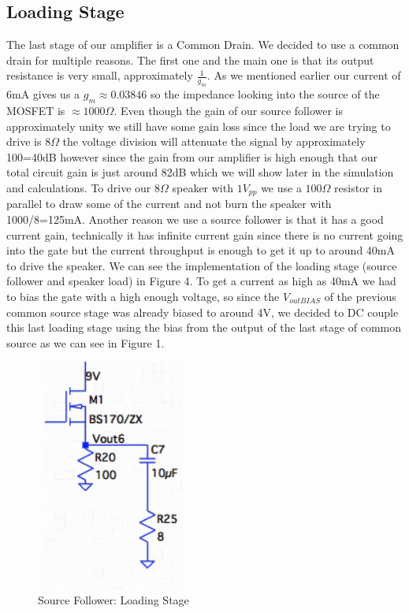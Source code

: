 \documentclass[11pt, twoside, letterpaper]{article}
\begin{document}
\subsection{Loading Stage}
The last stage of our amplifier is a Common Drain. We decided to use a common drain for multiple reasons. The first one and the main one
is that its output resistance is very small, approximately $\frac{1}{g_m}$. As we mentioned earlier our current of 6mA gives us a $g_m\approx0.03846$
so the impedance looking into the source of the MOSFET is $\approx 1000\Omega$. Even though the gain of our source follower is approximately unity we
still have some gain loss since the load we are trying to drive is $8\Omega$ the voltage division will attenuate the signal by approximately 100=40dB 
however since the gain from our amplifier is high enough that our total circuit gain is just around 82dB which we will show later in the simulation 
and calculations. To drive our $8\Omega$ speaker with $1V_{pp}$ we use a $100\Omega$ resistor in parallel to draw some of the current and not burn 
the speaker with 1000/8=125mA. Another reason we use a source follower is that it has a good current gain, technically it has infinite current gain 
since there is no current going into the gate but the current throughput is enough to get it up to around 40mA to drive the speaker. We can see the 
implementation of the loading stage (source follower and speaker load) in Figure 4. To get a current as high as 40mA we had to bias the gate with a 
high enough voltage, so since the $V_{outBIAS}$ of the previous common source stage was already biased to around 4V, we decided to DC couple this 
last loading stage using the bias from the output of the last stage of common source as we can see in Figure 1.

\begin{figure}[htbp]
\begin{center}
\includegraphics[width=2in,height=3in]{SourceFollower.png}
\caption{Source Follower: Loading Stage}
\end{center}
\end{figure}
\FloatBarrier
\end{document}
